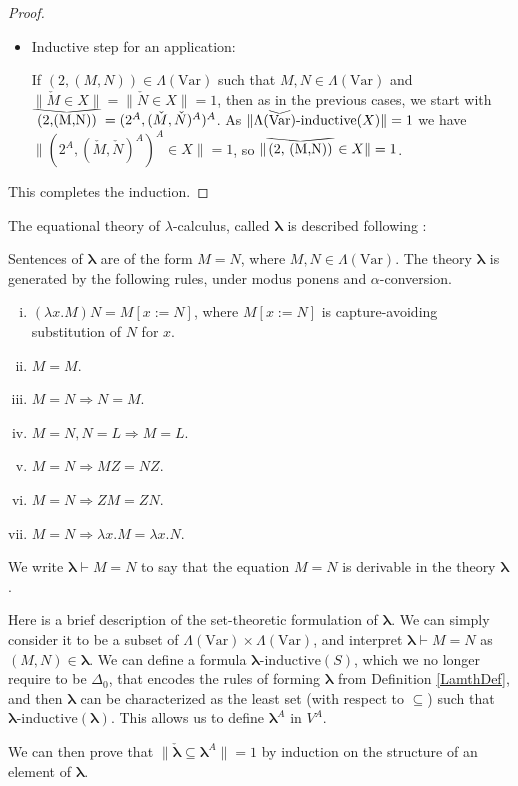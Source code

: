 \documentclass{lmcs}
\newcommand{\Var}{\ensuremath{\mathrm{Var}}}
\newcommand{\lamth}{\boldsymbol{\lambda}} %
\newcommand{\verywidecheck}[1]{
	\savestack{\tmpbox}{\stretchto{
			\scaleto{
				\scalerel*[\widthof{\ensuremath{#1}}]{\kern-.6pt\bigvee\kern-.6pt}
				{\rule[-\textheight/2]{1ex}{\textheight}}
			}{\textheight}
		}{0.5ex}}
	\stackon[1pt]{#1}{\tmpbox}
}
\newcommand{\form}[1]{\mathrm{#1}} %
\newcommand{\hInductive}[1]{{#1}\text{-}\form{inductive}}
\begin{document}
\begin{proof}
\begin{itemize}
\item Inductive step for an application:
		
If $(2,(M,N)) \in \Lambda(\Var)$ such that $M,N \in \Lambda(\Var)$ and $\| \check{M} \in X \| = \| \check{N} \in X \| = 1$, then as in the previous cases, we start with $\verywidecheck{(2,(M,N))} = (2^A,(\check{M},\check{N})^A)^A$. As $\| \hInductive{\Lambda(\verywidecheck{\Var})}(X)\|  = 1$ we have $\| (2^A,(\check{M},\check{N})^A)^A \in X \| = 1$, so $\| \verywidecheck{(2, (M,N))} \in X \| = 1$. 
\end{itemize}
This completes the induction. 
\end{proof}

The equational theory of $\lambda$-calculus, called $\lamth$ is described following \cite{barendregt84}:

\begin{defi}
	\label{LamthDef}
	Sentences of $\lamth$ are of the form $M = N$, where $M,N \in \Lambda(\Var)$. The theory $\lamth$ is generated by the following rules, under modus ponens and $\alpha$-conversion. %
	\begin{enumerate}[(i)]
		\item $(\lambda x. M) N = M[x := N]$, where $M[x := N]$ is capture-avoiding substitution of $N$ for $x$. 
		\item $M = M$.
		\item $M = N \Rightarrow N = M$.
		\item $M = N, N = L \Rightarrow M = L$.
		\item $M = N \Rightarrow MZ = NZ$.
		\item $M = N \Rightarrow ZM = ZN$.
		\item $M = N \Rightarrow \lambda x. M = \lambda x. N$. \qedhere
	\end{enumerate}
\end{defi}
We write $\lamth \vdash M = N$ to say that the equation $M = N$ is derivable in the theory $\lamth$. 

\begin{exa}
	\label{LamthSetExample}
	Here is a brief description of the set-theoretic formulation of $\lamth$. We can simply consider it to be a subset of $\Lambda(\Var) \times \Lambda(\Var)$, and interpret $\lamth \vdash M = N$ as $(M,N) \in \lamth$. We can define a formula $\hInductive{\lamth}(S)$, which we no longer require to be $\Delta_0$, that encodes the rules of forming $\lamth$ from Definition \ref{LamthDef}, and then $\lamth$ can be characterized as the least set (with respect to $\subseteq$) such that $\hInductive{\lamth}(\lamth)$. This allows us to define $\lamth^A$ in $V^A$. 
	
	We can then prove that $\| \check{\lamth} \subseteq \lamth^A\| = 1$ by induction on the structure of an element of $\lamth$. %
\end{exa}
\end{document}
